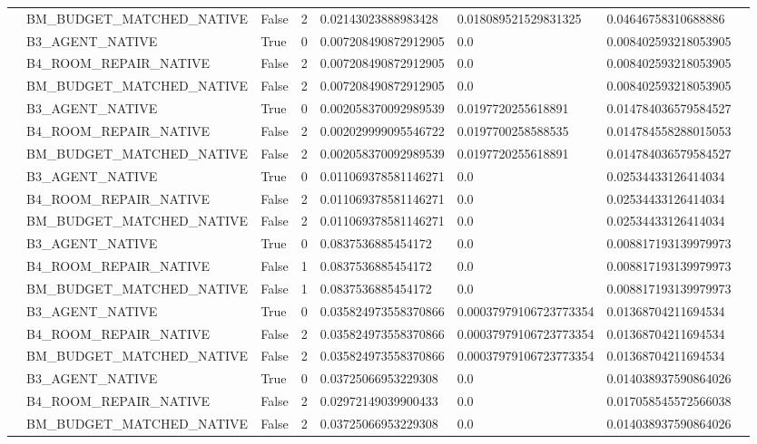 \begin{tabular}{llllllll}
 & BM\_BUDGET\_MATCHED\_NATIVE & False & 2 & 0.02143023888983428 & 0.018089521529831325 & 0.04646758310688886 &  \\
 & B3\_AGENT\_NATIVE & True & 0 & 0.007208490872912905 & 0.0 & 0.008402593218053905 &  \\
 & B4\_ROOM\_REPAIR\_NATIVE & False & 2 & 0.007208490872912905 & 0.0 & 0.008402593218053905 &  \\
 & BM\_BUDGET\_MATCHED\_NATIVE & False & 2 & 0.007208490872912905 & 0.0 & 0.008402593218053905 &  \\
 & B3\_AGENT\_NATIVE & True & 0 & 0.002058370092989539 & 0.0197720255618891 & 0.014784036579584527 &  \\
 & B4\_ROOM\_REPAIR\_NATIVE & False & 2 & 0.002029999095546722 & 0.0197700258588535 & 0.014784558288015053 &  \\
 & BM\_BUDGET\_MATCHED\_NATIVE & False & 2 & 0.002058370092989539 & 0.0197720255618891 & 0.014784036579584527 &  \\
 & B3\_AGENT\_NATIVE & True & 0 & 0.011069378581146271 & 0.0 & 0.02534433126414034 &  \\
 & B4\_ROOM\_REPAIR\_NATIVE & False & 2 & 0.011069378581146271 & 0.0 & 0.02534433126414034 &  \\
 & BM\_BUDGET\_MATCHED\_NATIVE & False & 2 & 0.011069378581146271 & 0.0 & 0.02534433126414034 &  \\
 & B3\_AGENT\_NATIVE & True & 0 & 0.0837536885454172 & 0.0 & 0.008817193139979973 &  \\
 & B4\_ROOM\_REPAIR\_NATIVE & False & 1 & 0.0837536885454172 & 0.0 & 0.008817193139979973 &  \\
 & BM\_BUDGET\_MATCHED\_NATIVE & False & 1 & 0.0837536885454172 & 0.0 & 0.008817193139979973 &  \\
 & B3\_AGENT\_NATIVE & True & 0 & 0.035824973558370866 & 0.00037979106723773354 & 0.01368704211694534 &  \\
 & B4\_ROOM\_REPAIR\_NATIVE & False & 2 & 0.035824973558370866 & 0.00037979106723773354 & 0.01368704211694534 &  \\
 & BM\_BUDGET\_MATCHED\_NATIVE & False & 2 & 0.035824973558370866 & 0.00037979106723773354 & 0.01368704211694534 &  \\
 & B3\_AGENT\_NATIVE & True & 0 & 0.03725066953229308 & 0.0 & 0.014038937590864026 &  \\
 & B4\_ROOM\_REPAIR\_NATIVE & False & 2 & 0.02972149039900433 & 0.0 & 0.017058545572566038 &  \\
 & BM\_BUDGET\_MATCHED\_NATIVE & False & 2 & 0.03725066953229308 & 0.0 & 0.014038937590864026 &  \\

\end{tabular}
